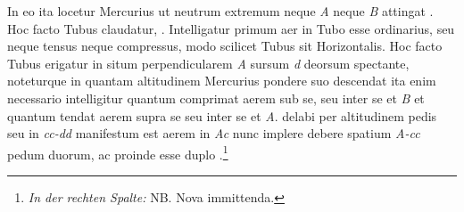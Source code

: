                     In eo ita locetur Mercurius\protect{} ut neutrum extremum neque \textit{A} neque \textit{B} attingat . Hoc facto Tubus claudatur, . Intelligatur primum aer in Tubo esse ordinarius, seu neque tensus neque compressus, modo scilicet Tubus sit Horizontalis. Hoc facto Tubus erigatur in situm perpendicularem \textit{A} sursum \textit{d} deorsum spectante, noteturque in quantam altitudinem Mercurius\protect{} pondere suo descendat ita enim necessario intelligitur quantum comprimat aerem sub se, seu inter se et \textit{B} et quantum tendat aerem supra se seu inter se et \textit{A}.  delabi per altitudinem pedis seu  in \textit{cc-dd} manifestum est aerem  in \textit{Ac}  nunc implere debere spatium \textit{A-cc} pedum duorum, ac proinde esse duplo .\footnote{\textit{In der rechten Spalte:} NB. Nova immittenda.   
}
